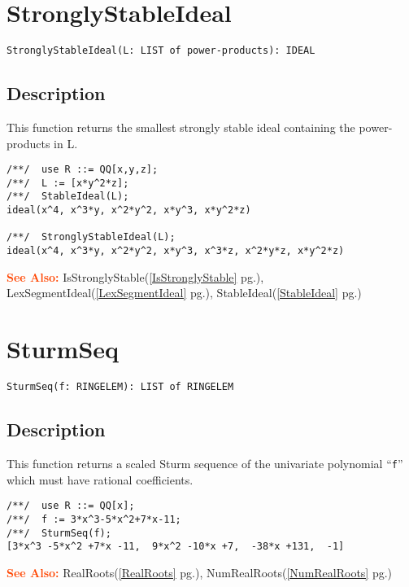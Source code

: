 \documentclass[a4paper]{mybook}
\newenvironment{command}{}{} %
\newcommand\SeeAlso{\par\textcolor{OrangeRed}{\textbf{\large See Also: }}}
\begin{document}
\section{StronglyStableIdeal}
\label{StronglyStableIdeal}
\begin{command} %


\begin{Verbatim}[label=syntax, rulecolor=\color{MidnightBlue},
frame=single]
StronglyStableIdeal(L: LIST of power-products): IDEAL
\end{Verbatim}


\subsection*{Description}

This function returns the smallest strongly stable ideal containing the
power-products in L.
\begin{Verbatim}[label=example, rulecolor=\color{PineGreen}, frame=single]
/**/  use R ::= QQ[x,y,z];
/**/  L := [x*y^2*z];
/**/  StableIdeal(L);
ideal(x^4, x^3*y, x^2*y^2, x*y^3, x*y^2*z)

/**/  StronglyStableIdeal(L);
ideal(x^4, x^3*y, x^2*y^2, x*y^3, x^3*z, x^2*y*z, x*y^2*z)
\end{Verbatim}


\SeeAlso %
  IsStronglyStable(\ref{IsStronglyStable} pg.\pageref{IsStronglyStable}), 
    LexSegmentIdeal(\ref{LexSegmentIdeal} pg.\pageref{LexSegmentIdeal}), 
    StableIdeal(\ref{StableIdeal} pg.\pageref{StableIdeal})
\end{command} %

\section{SturmSeq}
\label{SturmSeq}
\begin{command} %


\begin{Verbatim}[label=syntax, rulecolor=\color{MidnightBlue},
frame=single]
SturmSeq(f: RINGELEM): LIST of RINGELEM
\end{Verbatim}


\subsection*{Description}

This function returns a scaled Sturm sequence of the univariate polynomial
``\verb&f&'' which must have rational coefficients.
\begin{Verbatim}[label=example, rulecolor=\color{PineGreen}, frame=single]
/**/  use R ::= QQ[x];
/**/  f := 3*x^3-5*x^2+7*x-11;
/**/  SturmSeq(f);
[3*x^3 -5*x^2 +7*x -11,  9*x^2 -10*x +7,  -38*x +131,  -1]
\end{Verbatim}


\SeeAlso %
  RealRoots(\ref{RealRoots} pg.\pageref{RealRoots}), 
    NumRealRoots(\ref{NumRealRoots} pg.\pageref{NumRealRoots})
\end{command} %
\end{document}

